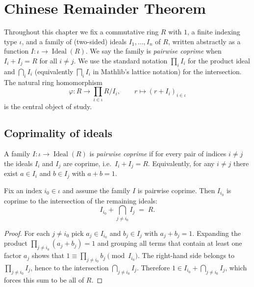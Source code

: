 \section{Chinese Remainder Theorem}

Throughout this chapter we fix a commutative ring $R$ with $1$, a finite
indexing type $\iota$, and a family of (two-sided) ideals
$I_1,\dots,I_n$ of $R$, written abstractly as a function
$I : \iota \to \operatorname{Ideal}(R)$. We say the family is
\emph{pairwise coprime} when $I_i + I_j = R$ for all $i \neq j$. We use
the standard notation $\prod_i I_i$ for the product ideal and
$\bigcap_i I_i$ (equivalently $\bigsqcap_i I_i$ in Mathlib's lattice
notation) for the intersection. The natural ring homomorphism
\[
  \varphi \colon R \longrightarrow \prod_{i \in \iota} R / I_i,
  \qquad r \longmapsto (r + I_i)_{i \in \iota}
\]
is the central object of study.

\subsection{Coprimality of ideals}

\begin{definition}
    \label{def:pairwise_coprime}
    A family $I : \iota \to \operatorname{Ideal}(R)$ is \emph{pairwise
    coprime} if for every pair of indices $i \neq j$ the ideals $I_i$
    and $I_j$ are coprime, i.e.\ $I_i + I_j = R$. Equivalently, for any
    $i \neq j$ there exist $a \in I_i$ and $b \in I_j$ with $a + b = 1$.
\end{definition}

\begin{lemma}
    \label{lem:coprime_with_inf}
    Fix an index $i_0 \in \iota$ and assume the family $I$ is pairwise
    coprime. Then $I_{i_0}$ is coprime to the intersection of the
    remaining ideals:
    \[
        I_{i_0} + \bigcap_{j \neq i_0} I_j \;=\; R.
    \]
\end{lemma}
\begin{proof}
    For each $j \neq i_0$ pick $a_j \in I_{i_0}$ and $b_j \in I_j$ with
    $a_j + b_j = 1$. Expanding the product
    $\prod_{j \neq i_0} (a_j + b_j) = 1$ and grouping all terms that
    contain at least one factor $a_j$ shows that
    $1 \equiv \prod_{j \neq i_0} b_j \pmod{I_{i_0}}$. The right-hand
    side belongs to $\prod_{j \neq i_0} I_j$, hence to the intersection
    $\bigcap_{j \neq i_0} I_j$. Therefore $1 \in I_{i_0} + \bigcap_{j
    \neq i_0} I_j$, which forces this sum to be all of $R$.
\end{proof}

